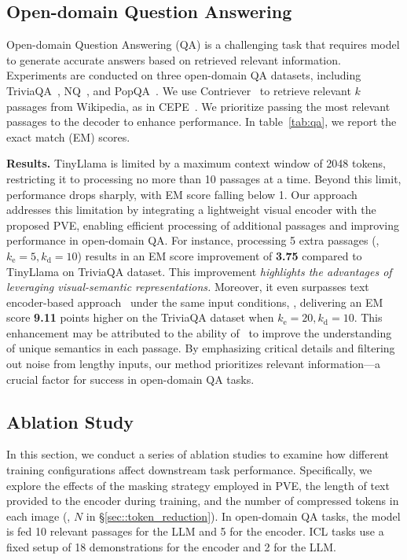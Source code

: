 \subsection{Open-domain Question Answering}
Open-domain Question Answering (QA) is a challenging task that requires model to generate accurate answers based on retrieved relevant information. 
Experiments are conducted on three open-domain QA datasets, including TriviaQA~\cite{joshi2017triviaqa}, NQ~\cite{kwiatkowski2019natural}, and PopQA~\cite{mallen2023not}. 
We use Contriever~\cite{izacardunsupervised} to retrieve relevant $k$ passages from Wikipedia, as in CEPE~\cite{yen2024long}. 
We prioritize passing the most relevant passages to the decoder to enhance performance. 
In table~\ref{tab:qa}, we report the exact match (EM) scores. 


\noindent\textbf{Results.} 
TinyLlama is limited by a maximum context window of 2048 tokens, restricting it to processing no more than 10 passages at a time. 
Beyond this limit, performance drops sharply, with EM score falling below 1. 
Our approach addresses this limitation by integrating a lightweight visual encoder with the proposed PVE, enabling efficient processing of additional passages and improving performance in open-domain QA. 
For instance, processing 5 extra passages (\ie, $k_\text{e}=5, k_\text{d}=10$) results in an EM score improvement of \textbf{3.75} compared to TinyLlama on TriviaQA dataset.
This improvement \textit{highlights the advantages of leveraging visual-semantic representations.}
Moreover, it even surpasses text encoder-based approach \mytext\ under the same input conditions, \eg, delivering an EM score \textbf{9.11} points higher on the TriviaQA dataset when $k_\text{e}=20, k_\text{d}=10$. 
This enhancement may be attributed to the ability of \ourname\ to improve the understanding of unique semantics in each passage. 
By emphasizing critical details and filtering out noise from lengthy inputs, our method prioritizes relevant information—a crucial factor for success in open-domain QA tasks. 

\subsection{Ablation Study}
In this section, we conduct a series of ablation studies to examine how different training configurations affect downstream task performance. Specifically, we explore the effects of  the masking strategy employed in PVE,  the length of text provided to the encoder during training, and  the number of compressed tokens in each image (\ie, $N$ in \S\ref{sec::token_reduction}). In open-domain QA tasks, the model is fed 10 relevant passages for the LLM and 5 for the encoder. ICL tasks use a fixed setup of 18 demonstrations for the encoder and 2 for the LLM.

